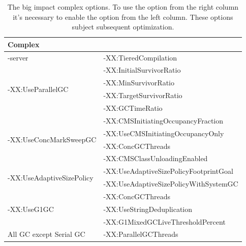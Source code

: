 \documentclass[
  digital, %
  oneside,
  notable, %
  nolof,     %
  nolot     %
]{fithesis3}
\begin{document}
	
	

\begin{table}[]
	\centering
	\begin{tabular}{|l|l|}
		\hline
		\multicolumn{2}{|l|}{\textbf{Complex}}                                              \\ \hline
		-server                                    & -XX:TieredCompilation                  \\ \hline
		\multirow{4}{*}{-XX:UseParallelGC}         & -XX:InitialSurvivorRatio               \\ \cline{2-2} 
		& -XX:MinSurvivorRatio                   \\ \cline{2-2} 
		& -XX:TargetSurvivorRatio                \\ \cline{2-2} 
		& -XX:GCTimeRatio                        \\ \hline
		\multirow{4}{*}{-XX:UseConcMarkSweepGC}    & -XX:CMSInitiatingOccupancyFraction     \\ \cline{2-2} 
		& -XX:UseCMSInitiatingOccupancyOnly      \\ \cline{2-2} 
		& -XX:ConcGCThreads                      \\ \cline{2-2} 
		& -XX:CMSClassUnloadingEnabled           \\ \hline
		\multirow{2}{*}{-XX:UseAdaptiveSizePolicy} & -XX:UseAdaptiveSizePolicyFootprintGoal \\ \cline{2-2} 
		& -XX:UseAdaptiveSizePolicyWithSystemGC  \\ \hline
		\multirow{3}{*}{-XX:UseG1GC}               & -XX:ConcGCThreads                      \\ \cline{2-2} 
		& -XX:UseStringDeduplication             \\ \cline{2-2} 
		& -XX:G1MixedGCLiveThresholdPercent      \\ \hline
		All GC except Serial GC                    & -XX:ParallelGCThreads                  \\ \hline
	\end{tabular}
	\caption{The big impact complex options. To use the option from the right column it's necessary to enable the  option from the left column. These options subject subsequent optimization.}
	\label{bigimpactcomplex}
\end{table}		
\end{document}
